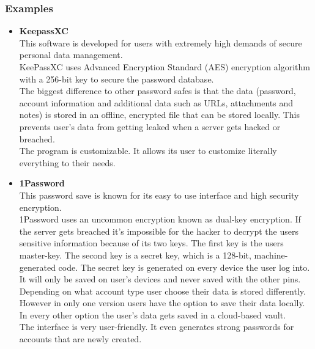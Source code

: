 \documentclass[conference]{IEEEtran}
\begin{document}
\subsubsection{Examples}
\begin{itemize}
\item \textbf{KeepassXC}\\
This software is developed for users with extremely high demands of secure personal data management. \\
KeePassXC uses Advanced Encryption Standard (AES) encryption algorithm with a 256-bit key to secure the password database.\\
The biggest difference to other password safes is that the data (password, account information and additional data such as URLs, attachments and notes) is stored in an offline, encrypted file that can be stored locally. This prevents user's data from getting leaked when a server gets hacked or breached.\\
The program is customizable. It allows its user to customize literally everything to their needs.\\

\item \textbf{1Password}\\
This password save is known for its easy to use interface and high security encryption.\\
1Password uses an uncommon encryption known as dual-key encryption. If the server gets breached it's impossible for the hacker to decrypt the users sensitive information because of its two keys. The first key is the users master-key. The second key is a secret key, which is a 128-bit, machine-generated code. The secret key is generated on every device the user log into. It will only be saved on user's devices and never saved with the other pins.\\
Depending on what account type user choose their data is stored differently. However in only one version users have the option to save their data locally. In every other option the user's data gets saved in a cloud-based vault.\\
The interface is very user-friendly. It even generates strong passwords for accounts that are newly created.

\end{itemize}
\end{document}
